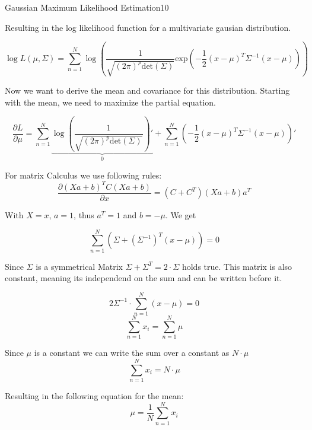 \begin{questions}
\begin{question}{Gaussian Maximum Likelihood Estimation}{10}
\begin{answer}
Resulting in the log likelihood function for a multivariate gausian distribution.

\begin{equation} \label{L}
	\log L(\mu, \Sigma) = \sum_{n=1}^{N} \log (\frac{1}{\sqrt{(2\pi)^p \text{det}(\Sigma)}} \text{exp} (-\frac{1}{2}(x-\mu)^T \Sigma^{-1} (x-\mu)))
\end{equation}

Now we want to derive the mean and covariance for this distribution. Starting with the mean, we need to maximize the partial equation.

\begin{equation}
\frac{\partial L }{\partial \mu} = \sum_{n=1}^{N} \underbrace{\log (\frac{1}{\sqrt{(2\pi)^p \text{det}(\Sigma)}})'}_{0} +
\sum_{n=1}^{N} (-\frac{1}{2}(x-\mu)^T \Sigma^{-1} (x-\mu))'
\end{equation}

For matrix Calculus we use following rules:
\begin{equation}
\frac{\partial(Xa+b)^T C(Xa+b)}{\partial x} = (C+C^T) (Xa +b)a^T
\end{equation}

With $X = x$, $a = 1$, thus $a^T = 1$ and $b = -\mu$. We get

\begin{equation}
\sum_{n=1}^{N} (\Sigma + (\Sigma^{-1})^T (x - \mu)) = 0
\end{equation}

Since $\Sigma$ is a symmetrical Matrix $\Sigma + \Sigma^T = 2\cdot\Sigma$ holds true. This matrix is also constant, meaning its independend on the sum and can be written before it.

\begin{equation}
2\Sigma^{-1} \cdot \sum_{n=1}^{N} (x-\mu) = 0
\end{equation}
\begin{equation}
\sum_{n=1}^{N}x_i = \sum_{n=1}^{N}\mu
\end{equation}

Since $\mu$ is a constant we can write the sum over a constant as $N\cdot\mu$
\begin{equation}
\sum_{n=1}^{N}x_i = N\cdot\mu
\end{equation}

Resulting in the following equation for the mean:
\begin{equation}
\mu = \frac{1}{N} \sum_{n=1}^{N}x_i
\end{equation}


\end{answer}
\end{question}
\end{questions}

